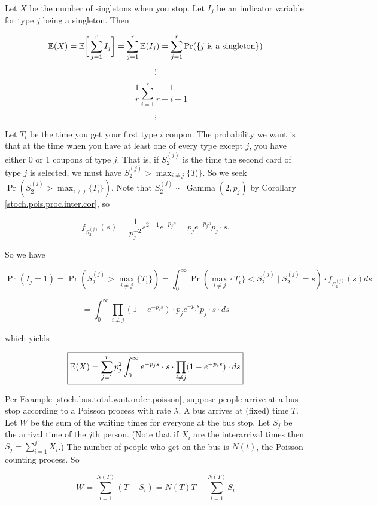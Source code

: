 \begin{solution} Let \(X\) be the number of singletons when you stop. Let \(I_j\) be an indicator variable for type \(j\) being a singleton. Then 

\[
\E(X) = \E \bigg[ \sum_{j=1}^r I_j \bigg] = \sum_{j=1}^r \E(I_j) = \sum_{j=1}^r \Pr(\{j \text{ is a singleton}\})
\]

\[
\vdots
\]

\[
= \frac{1}{r} \sum_{i=1}^r \frac{1}{r-i+1}
\]

\[
\vdots
\]

Let \(T_i\) be the time you get your first type \(i\) coupon. The probability we want is that at the time when you have at least one of every type except \(j\), you have either 0 or 1 coupons of type \(j\). That is, if \(S_2^{(j)}\) is the time the second card of type \(j\) is selected, we must have \(S_2^{(j)} > \max_{i \neq j} \{T_i\}\). So we seek \(\Pr( S_2^{(j)} > \max_{i \neq j} \{T_i\} ) \). Note that \(S_2^{(j)} \sim \operatorname{Gamma}(2, p_j)\) by Corollary \ref{stoch.pois.proc.inter.cor}, so 

\[
f_{S_2^{(j)}}(s) = \frac{1}{p_j^{-2}} s^{2-1} e^{-p_j s} =  p_j e^{-p_j s} p_j \cdot s   .
\]

So we have

\[
\Pr(I_j = 1) = \Pr( S_2^{(j)} > \max_{i \neq j} \{T_i\} ) = \int_0^\infty \Pr(  \max_{i \neq j} \{T_i\} < S_2^{(j)} \mid S_2^{(j)}  = s )\cdot f_{S_2^{(j)}}(s)ds
\]

\[
= \int_0^\infty \prod_{i \neq j} (1 - e^{- p_i s} )  \cdot p_j e^{-p_j s} p_j \cdot s \cdot ds
\]

which yields

\[
\boxed{\E(X) = \sum_{j=1}^r p_j^2 \int_0^\infty e^{-p_j s}  \cdot s \cdot \prod_{i \neq j} (1 - e^{- p_i s} )  \cdot ds}
\]

\end{solution}

\begin{remark}Per Example \ref{stoch.bus.total.wait.order.poisson}, suppose people arrive at a bus stop according to a Poisson process with rate \(\lambda\). A bus arrives at (fixed) time \(T\). Let \(W\) be the sum of the waiting times for everyone at the bus stop. Let \(S_j\) be the arrival time of the \(j\)th person. (Note that if \(X_i\) are the interarrival times then \(S_j = \sum_{i=1}^j X_i\).) The number of people who get on the bus is \(N(t)\), the Poisson counting process. So 

\[
W = \sum_{i=1}^{N(T)} (T - S_i)   = N(T) T - \sum_{i=1}^{N(T)}S_i
\]

\end{remark}

